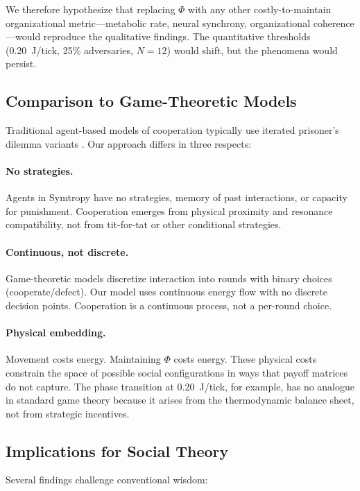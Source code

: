 \documentclass[12pt,a4paper]{article}
\begin{document}
We therefore hypothesize that replacing $\Phi$ with any other costly-to-maintain organizational metric---metabolic rate, neural synchrony, organizational coherence---would reproduce the qualitative findings. The quantitative thresholds (0.20~J/tick, 25\% adversaries, $N = 12$) would shift, but the phenomena would persist.

\subsection{Comparison to Game-Theoretic Models}

Traditional agent-based models of cooperation typically use iterated prisoner's dilemma variants \citep{axelrod1984, nowak2006}. Our approach differs in three respects:

\paragraph{No strategies.} Agents in Symtropy have no strategies, memory of past interactions, or capacity for punishment. Cooperation emerges from physical proximity and resonance compatibility, not from tit-for-tat or other conditional strategies.

\paragraph{Continuous, not discrete.} Game-theoretic models discretize interaction into rounds with binary choices (cooperate/defect). Our model uses continuous energy flow with no discrete decision points. Cooperation is a continuous process, not a per-round choice.

\paragraph{Physical embedding.} Movement costs energy. Maintaining $\Phi$ costs energy. These physical costs constrain the space of possible social configurations in ways that payoff matrices do not capture. The phase transition at 0.20~J/tick, for example, has no analogue in standard game theory because it arises from the thermodynamic balance sheet, not from strategic incentives.

\subsection{Implications for Social Theory}

Several findings challenge conventional wisdom:
\end{document}
